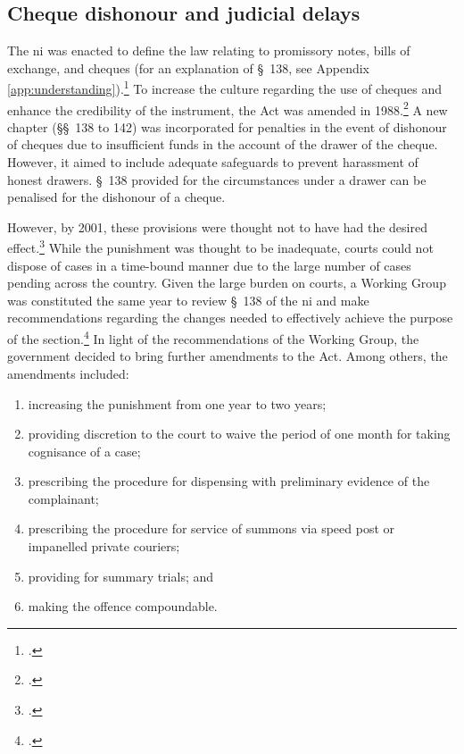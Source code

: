 \begin{enumerate}
\begin{enumerate}
\section{Cheque dishonour and judicial delays} \label{sec:history}

The \acrlong{ni} was enacted to define the law relating to promissory notes, bills of exchange, and cheques (for an explanation of \S~138, see Appendix \ref{app:understanding}).\footcite{ind1881_niAct} To increase the culture regarding the use of cheques and enhance the credibility of the instrument, the Act was amended in 1988.\footcite{niAmend1988} A new chapter (\S\S~138 to 142) was incorporated for penalties in the event of dishonour of cheques due to insufficient funds in the account of the drawer of the cheque. However, it aimed to include adequate safeguards to prevent harassment of honest drawers. \S~138 provided for the circumstances under a drawer can be penalised for the dishonour of a cheque.

However, by 2001, these provisions were thought not to have had the desired effect.\footcite{stdcomm2001_138niAct} While the punishment was thought to be inadequate, courts could not dispose of cases in a time-bound manner due to the large number of cases pending across the country. Given the large burden on courts, a Working Group was constituted the same year to review \S~138 of the \gls{ni} and make recommendations regarding the changes needed to effectively achieve the purpose of the section.\footcite{wg2001_138} In light of the recommendations of the Working Group, the government decided to bring further amendments to the Act. Among others, the amendments included:

\begin{enumerate}[label=(\alph*)]
 \item increasing the punishment from one year to two years;
 \item providing discretion to the court to waive the period of one month for taking cognisance of a case;
 \item prescribing the procedure for dispensing with preliminary evidence of the complainant;
 \item prescribing the procedure for service of summons via speed post or impanelled private couriers;
 \item providing for summary trials; and
 \item making the offence compoundable.
\end{enumerate}


\end{enumerate}
\end{enumerate}
